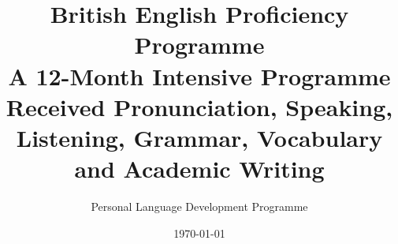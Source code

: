 \documentclass[
    12pt,
    a4paper,
    oneside,
    openany
]{book}
\title{
    \Huge
    \textbf{
        British English Proficiency Programme
    }
    \\[0.5cm]
    \Large
    A 12-Month Intensive Programme
    \\[0.2cm]
    \large
    Received Pronunciation, Speaking, Listening,
    Grammar, Vocabulary and Academic Writing
}
\author{
    Personal Language Development Programme
}
\date{
    \today
}
\begin{document}
\fi

\frontmatter

\maketitle

\cleardoublepage


%

%


\cleardoublepage

\tableofcontents

\cleardoublepage

%
\listoffigures
\cleardoublepage
%
\listoftables
\cleardoublepage


\mainmatter

%
%
%
\end{document}
